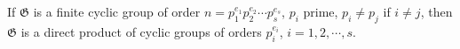If $\mathfrak{G}$ is a finite cyclic group of order $n = p_1^{e_1}p_2^{e_2} \cdots p_s^{e_s}$, $p_i$ prime, $p_i \neq p_j$ if $i \neq j$, then $\mathfrak{G}$ is a direct product of cyclic groups of orders $p_i^{e_i}$, $i = 1, 2, \cdots, s$.
